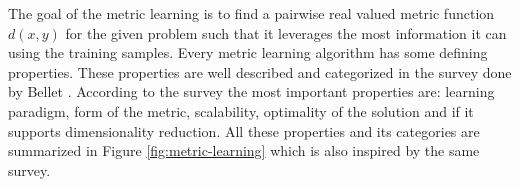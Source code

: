\documentclass[12pt,a4paper]{report}
\begin{document}
The goal of the metric learning is to find a pairwise real valued metric function $d(x,y)$ for the given problem such that it leverages the most information it can using the training samples. Every metric learning algorithm has some defining properties. These properties are well described and categorized in the survey done by Bellet \citep{bellet2013survey}. According to the survey the most important properties are: learning paradigm, form of the metric, scalability, optimality of the solution and if it supports dimensionality reduction. All these properties and its categories are summarized in Figure \ref{fig:metric-learning} which is also inspired by the same survey.

\end{document}
